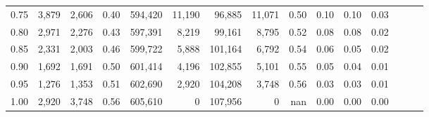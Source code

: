 \begin{tabular}{rrrrrrrrrrrrrrr}
0.75 &   3,879 &   2,606 &  0.40 &  594,420 &   11,190 &   96,885 &   11,071 &  0.50 &  0.10 &  0.10 &      0.03 \\
0.80 &   2,971 &   2,276 &  0.43 &  597,391 &    8,219 &   99,161 &    8,795 &  0.52 &  0.08 &  0.08 &      0.02 \\
0.85 &   2,331 &   2,003 &  0.46 &  599,722 &    5,888 &  101,164 &    6,792 &  0.54 &  0.06 &  0.05 &      0.02 \\
0.90 &   1,692 &   1,691 &  0.50 &  601,414 &    4,196 &  102,855 &    5,101 &  0.55 &  0.05 &  0.04 &      0.01 \\
0.95 &   1,276 &   1,353 &  0.51 &  602,690 &    2,920 &  104,208 &    3,748 &  0.56 &  0.03 &  0.03 &      0.01 \\
1.00 &   2,920 &   3,748 &  0.56 &  605,610 &        0 &  107,956 &        0 &   nan &  0.00 &  0.00 &      0.00 \\
\bottomrule
\end{tabular}
